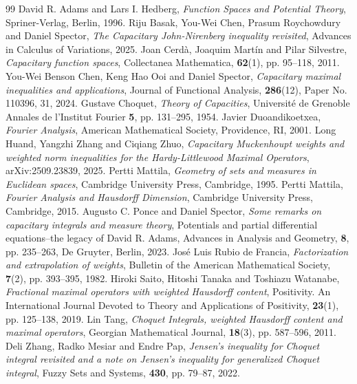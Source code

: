 \documentclass{amsart}
\numberwithin{theorem}{section}
\numberwithin{equation}{section}
\begin{document}

		\begin{thebibliography}{99}
		 David R. Adams and Lars I. Hedberg, \textit{Function Spaces and Potential Theory}, Spriner-Verlag, Berlin, 1996.
		 Riju Basak, You-Wei Chen, Prasum Roychowdury and Daniel Spector, \textit{The Capacitary John-Nirenberg inequality revisited}, Advances in Calculus of Variations, 2025.
		 Joan Cerd\`{a}, Joaquim Mart\'{i}n and Pilar Silvestre, \textit{Capacitary function spaces}, Collectanea Mathematica, \textbf{62}(1), pp. 95--118, 2011.
		 You-Wei Benson Chen, Keng Hao Ooi and Daniel Spector, \textit{Capacitary maximal inequalities and applications}, Journal of Functional Analysis, \textbf{286}(12), Paper No. 110396, 31, 2024.
		 Gustave Choquet, \textit{Theory of Capacities}, Universit\'{e} de Grenoble Annales de l'Institut Fourier \textbf{5}, pp. 131--295, 1954.
		 Javier Duoandikoetxea, \textit{Fourier Analysis}, American Mathematical Society, Providence, RI, 2001.
		 Long Huand, Yangzhi Zhang and Ciqiang Zhuo, \textit{Capacitary Muckenhoupt weights and weighted norm inequalities for the Hardy-Littlewood Maximal Operators}, arXiv:2509.23839, 2025.
		 Pertti Mattila, \textit{Geometry of sets and measures in Euclidean spaces}, Cambridge University Press, Cambridge, 1995.
		 Pertti Mattila, \textit{Fourier Analysis and Hausdorff Dimension}, Cambridge University Press, Cambridge, 2015.
		 Augusto C. Ponce and Daniel Spector, \textit{Some remarks on capacitary integrals and measure theory}, Potentials and partial differential equations--the legacy of David R. Adams, Advances in Analysis and Geometry, \textbf{8}, pp. 235--263, De Gruyter, Berlin, 2023.
		 Jos\'{e} Luis Rubio de Francia, \textit{Factorization and extrapolation of weights}, Bulletin of the American Mathematical Society, \textbf{7}(2), pp. 393--395, 1982.
		 Hiroki Saito, Hitoshi Tanaka and Toshiazu Watanabe, \textit{Fractional maximal operators with weighted Hausdorff content}, Positivity. An International Journal Devoted to Theory and Applications of Positivity, \textbf{23}(1), pp. 125--138, 2019.
		 Lin Tang, \textit{Choquet Integrals, weighted Hausdorff content and maximal operators}, Georgian Mathematical Journal, \textbf{18}(3), pp. 587--596, 2011.
		 Deli Zhang, Radko Mesiar and Endre Pap, \textit{Jensen's inequality for Choquet integral revisited and a note on Jensen's inequality for generalized Choquet integral}, Fuzzy Sets and Systems, \textbf{430}, pp. 79--87, 2022.
	\end{thebibliography}
\end{document}
